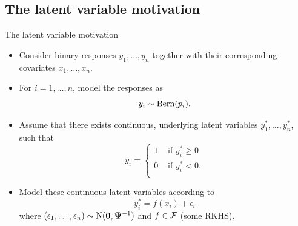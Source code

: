 \subsection{The latent variable motivation}

\begin{frame}{The latent variable motivation}
  \begin{itemize}
    \item<1-> Consider binary responses $y_1, \dots, y_n$ together with their corresponding covariates $x_1, \dots, x_n$. 
    \item<1-> For $i=1,\dots,n$, model the responses as
    \[
      y_i \sim \operatorname{Bern}(p_i).
    \]
    \item<2-> Assume that there exists continuous, underlying latent variables $y_1^*, \dots, y_n^*$, such that
    \[
      y_i =
      \begin{cases}
        1 & \text{ if } y_i^* \geq 0 \\
        0 & \text{ if } y_i^* < 0.    \\
      \end{cases}
    \]
    \item<3-> Model these continuous latent variables according to
    \[
      y_i^* = f(x_i) + \epsilon_i
    \]
    where $(\epsilon_1, \dots, \epsilon_n) \sim \operatorname{N}({\mathbf 0}, {\bm\Psi}^{-1})$ and $f \in {\mathcal F}$ (some RKHS).
  \end{itemize}
\end{frame}

